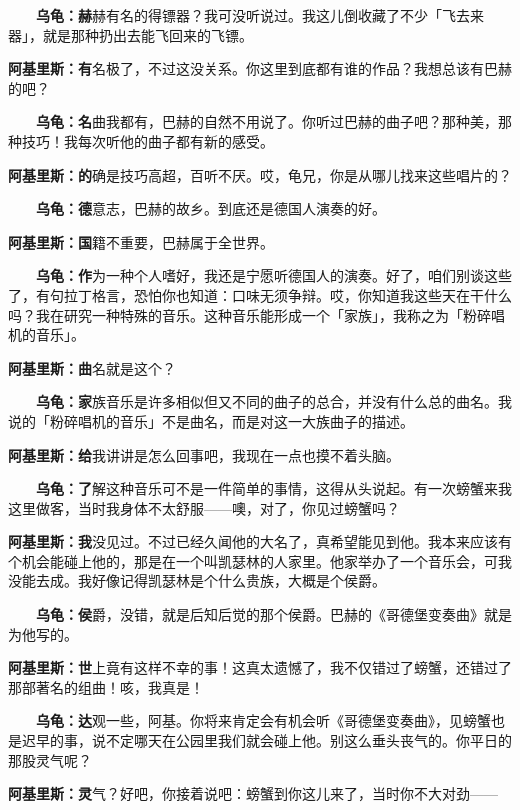\documentclass[
  12pt,
  twoside,
  openright,
  oldfontcommands,
]{memoir}
\newcommand{\heititext}[1]{{\heifamily\bfseries #1}}
\newcommand{\dialogname}[1]{{\heifamily\bfseries #1}}
\begin{document}
\dialogname{　　乌龟：}\heititext{赫}赫有名的得镖器？我可没听说过。我这儿倒收藏了不少「飞去来器」，就是那种扔出去能飞回来的飞镖。

\dialogname{阿基里斯：}\heititext{有}名极了，不过这没关系。你这里到底都有谁的作品？我想总该有巴赫的吧？

\dialogname{　　乌龟：}\heititext{名}曲我都有，巴赫的自然不用说了。你听过巴赫的曲子吧？那种美，那种技巧！我每次听他的曲子都有新的感受。

\dialogname{阿基里斯：}\heititext{的}确是技巧高超，百听不厌。哎，龟兄，你是从哪儿找来这些唱片的？

\dialogname{　　乌龟：}\heititext{德}意志，巴赫的故乡。到底还是德国人演奏的好。

\dialogname{阿基里斯：}\heititext{国}籍不重要，巴赫属于全世界。

\dialogname{　　乌龟：}\heititext{作}为一种个人嗜好，我还是宁愿听德国人的演奏。好了，咱们别谈这些了，有句拉丁格言，恐怕你也知道：口味无须争辩。哎，你知道我这些天在干什么吗？我在研究一种特殊的音乐。这种音乐能形成一个「家族」，我称之为「粉碎唱机的音乐」。

\dialogname{阿基里斯：}\heititext{曲}名就是这个？

\dialogname{　　乌龟：}\heititext{家}族音乐是许多相似但又不同的曲子的总合，并没有什么总的曲名。我说的「粉碎唱机的音乐」不是曲名，而是对这一大族曲子的描述。

\dialogname{阿基里斯：}\heititext{给}我讲讲是怎么回事吧，我现在一点也摸不着头脑。

\dialogname{　　乌龟：}\heititext{了}解这种音乐可不是一件简单的事情，这得从头说起。有一次螃蟹来我这里做客，当时我身体不太舒服------噢，对了，你见过螃蟹吗？

\dialogname{阿基里斯：}\heititext{我}没见过。不过已经久闻他的大名了，真希望能见到他。我本来应该有个机会能碰上他的，那是在一个叫凯瑟林的人家里。他家举办了一个音乐会，可我没能去成。我好像记得凯瑟林是个什么贵族，大概是个侯爵。

\dialogname{　　乌龟：}\heititext{侯}爵，没错，就是后知后觉的那个侯爵。巴赫的《哥德堡变奏曲》就是为他写的。

\dialogname{阿基里斯：}\heititext{世}上竟有这样不幸的事！这真太遗憾了，我不仅错过了螃蟹，还错过了那部著名的组曲！咳，我真是！

\dialogname{　　乌龟：}\heititext{达}观一些，阿基。你将来肯定会有机会听《哥德堡变奏曲》，见螃蟹也是迟早的事，说不定哪天在公园里我们就会碰上他。别这么垂头丧气的。你平日的那股灵气呢？

\dialogname{阿基里斯：}\heititext{灵}气？好吧，你接着说吧：螃蟹到你这儿来了，当时你不大对劲------
\end{document}
